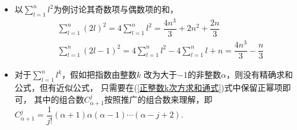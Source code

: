 \begin{itemize}[leftmargin=\inteval{\myitemleftmargin}pt,itemsep=
   \inteval{\myitemitempsep}pt,topsep=\inteval{\myitemtopsep}pt]
{\begin{align*}
        \hspace{5.8cm} &  \\
        = C_k^0B_0\left(C_k^1n^{k-1}+C_k^2n^{k-2}+C_k^3n^{k-3}+C_k^4n^{k-4}+\cdots+C_k^{k-1}n+C_k^k\quad \right) &\\
        + C_k^1B_1\left(C_{k-1}^1n^{k-2}+C_{k-1}^2n^{k-3}+C_{k-1}^3n^{k-4}+\cdots+C_{k-1}^{k-2}n
        + C_{k-1}^{k-1}\right) & \\
        + C_k^2B_2\left(C_{k-2}^1n^{k-3}+C_{k-2}^2n^{k-4}+\cdots+C_{k-2}^{k-3}n
        + C_{k-2}^{k-2}\right) & \\
        +\cdots\ \ & \\
        + C_k^{k-2}B_{k-2}\left(C_2^1n+C_2^2 \right) & \\
        +C_k^{k-1}B_{k-1}C_1^1 & \\
        \hline
        =kn^{k-1}+\left(C_k^0B_0C_k^2+C_k^1B_1C_{k-1}^1\right)n^{k-2}+ 
        \left(C_k^0B_0C_k^3+C_k^1B_1C_{k-1}^2+C_k^2B_2C_{k-2}^1\right)n^{k-3}& \\
        +\cdots +   \left(C_k^0B_0C_k^{k-1}+C_k^1B_1C_{k-1}^{k-2}+\cdots+C_k^{k-2}B_{k-2}C_2^1\right)n
        & \\
        +\left(C_k^0B_0C_k^{k}+C_k^1B_1C_{k-1}^{k-1}+\cdots+C_k^{k-2}B_{k-2}C_2^2+
        C_k^{k-1}B_{k-1}C_1^1 \right) & \\
        =kn^{k-1}
\end{align*}}
上面的过程应用了如下性质：当$ m\geq 2$时，$ n^{k-m} $的系数是
\begin{align*}
    \sum_{j=0}^{m-1}C_k^jB_jC_{k-j}^{m-j}=&\sum_{j=0}^{m-1}\dfrac{k!}{(k-j)!j!}
    \cdot\dfrac{(k-j)!}{(k-m)!(m-j)!}B_j  \\
    =&\sum_{j=0}^{m-1}\dfrac{k!}{m!(k-m)!}\cdot\dfrac{m!}{j!(m-j)!}B_j 
    =C_k^m\sum_{j=0}^{m-1}C_m^jB_j =0
\end{align*}
所以，在$ n+1 $时，(\ref{正整数k次方求和通式})式也成立。

\item 以$ \sum\limits_{l=1}^{n} l^2 $为例讨论其奇数项与偶数项的和，
\begin{align*}
    & \sum\limits_{l=1}^{n} (2l)^2=4\sum\limits_{l=1}^{n} l^2=\dfrac{4n^3}{3}+2n^2+\dfrac{2n}{3}  \\
    & \sum\limits_{l=1}^{n} (2l-1)^2=4\sum\limits_{l=1}^{n} l^2-4\sum\limits_{l=1}^{n} l+n=
    \dfrac{4n^3}{3}-\dfrac{n}{3}
\end{align*}

\item 对于$ \sum\limits_{l=1}^{n} l^k $，假如把指数由整数$ k $
改为大于$ -1 $的非整数$ \alpha $，则没有精确求和公式，但有近似公式，
只需要在(\ref{正整数k次方求和通式})式中保留正幂项即可，
其中的组合数$ C_{\alpha+1}^j $按照推广的组合数来理解，即
$ C_{\alpha+1}^j=\dfrac{1}{j!}(\alpha+1)\alpha (\alpha-1)
\cdots (\alpha-j+2) $. 


\end{itemize}
